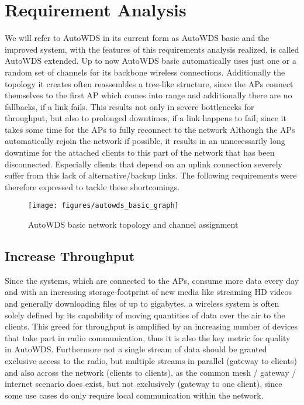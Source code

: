\chapter{Requirement Analysis}
  \label{reqana}
  We will refer to AutoWDS in its current form as AutoWDS basic and the improved system, with the features of this requirements analysis realized, 
  is called AutoWDS extended.
  Up to now AutoWDS basic automatically uses just one or a random set of channels for its backbone wireless connections. 
  Additionally the topology it creates often reassembles a tree-like structure, since the APs connect themselves 
  to the first \ac{AP} which comes into range and additionally there are no fallbacks, if a link fails. 
  This results not only in severe bottlenecks for throughput, but also to prolonged downtimes, if a link happens to fail, since
  it takes some time for the APs to fully reconnect to the network Although the APs automatically rejoin the network if possible, 
  it results in an unnecessarily long downtime for the attached clients to this part of the network that has been disconnected. 
  Especially clients that depend on an uplink connection severely suffer from this lack of alternative/backup links. 
  The following requirements were therefore expressed to tackle these shortcomings.
  
  \begin{figure}[h!]
    \centering
    \texttt{[image: figures/autowds\_basic\_graph]}
    \caption{AutoWDS basic network topology and channel assignment}
    \label{fig:autowds_basic_graph}
  \end{figure}

  \section{Increase Throughput}
  \label{reqincreasethroughput}
  Since the systems, which are connected to the APs, consume more data every day and with an increasing storage-footprint of new media like streaming \ac{HD} videos
  and generally downloading files of up to gigabytes, a wireless system is often solely defined by its capability of moving quantities of data over the air to the clients.
  This greed for throughput is amplified by an increasing number of devices that take part in radio communication, 
  thus it is also the key metric for quality in AutoWDS. 
  Furthermore not a single stream of data should be granted exclusive access to the radio, but
  multiple streams in parallel (gateway to clients) and also across the network (clients to clients), 
  as the common mesh / gateway / internet scenario does exist, but not exclusively (gateway to one client),
  since some use cases do only require local communication within the network.
  
